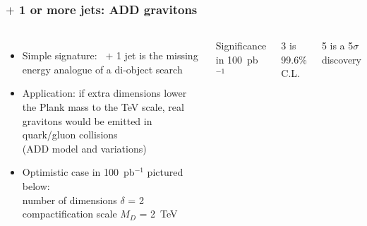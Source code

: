 \documentclass[compress]{beamer}
\begin{document}
\begin{frame}
\frametitle{\met $+$ 1 or more jets: ADD gravitons}
\begin{columns}
\begin{itemize}
\item Simple signature: \met\ $+$ 1 jet is the missing energy analogue of a di-object search

\item Application: if extra dimensions lower the Plank mass to the TeV scale, real
  gravitons would be emitted in quark/gluon collisions \\ (ADD model and variations)

\item Optimistic case in 100~pb$^{-1}$ pictured below: \\ number of dimensions $\delta$ = 2 \\ compactification scale $M_D$ = 2~TeV

\end{itemize}

\vfill
{}

\scriptsize Significance in 100~pb$^{-1}$

\hspace{0.25 cm} 3 is 99.6\% C.L.

\hspace{0.25 cm} 5 is a 5$\sigma$ discovery


\end{columns}
\end{frame}
\end{document}
